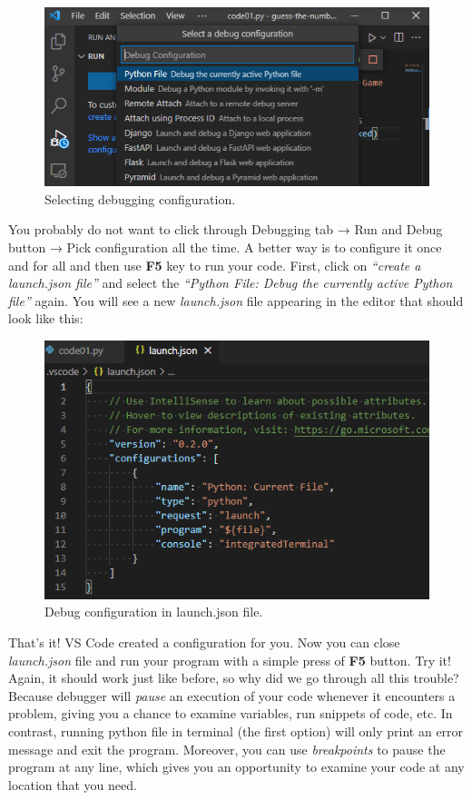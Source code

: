\documentclass[
]{book}
\begin{document}
\begin{figure}
\centering
\includegraphics{images/debug-select-debug-configuration.png}
\caption{Selecting debugging configuration.}
\end{figure}

You probably do not want to click through Debugging tab → Run and Debug button → Pick configuration all the time. A better way is to configure it once and for all and then use \textbf{F5} key to run your code. First, click on \emph{``create a launch.json file''} and select the \emph{``Python File: Debug the currently active Python file''} again. You will see a new \emph{launch.json} file appearing in the editor that should look like this:

\begin{figure}
\centering
\includegraphics{images/debug-launch-json.png}
\caption{Debug configuration in launch.json file.}
\end{figure}

That's it! VS Code created a configuration for you. Now you can close \emph{launch.json} file and run your program with a simple press of \textbf{F5} button. Try it! Again, it should work just like before, so why did we go through all this trouble? Because debugger will \emph{pause} an execution of your code whenever it encounters a problem, giving you a chance to examine variables, run snippets of code, etc. In contrast, running python file in terminal (the first option) will only print an error message and exit the program. Moreover, you can use \emph{breakpoints} to pause the program at any line, which gives you an opportunity to examine your code at any location that you need.
\end{document}
